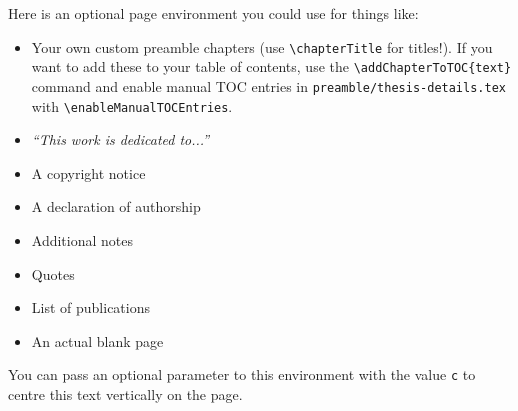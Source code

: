 
\begin{blankpage}
    
	Here is an optional page environment you could use for things like:
	\begin{itemize}
		\item Your own custom preamble chapters (use \texttt{\textbackslash chapterTitle} for titles!). If you want to add these to your table of contents, use the \texttt{\textbackslash addChapterToTOC\{text\} } command and enable manual TOC entries in \texttt{preamble/thesis-details.tex} with \texttt{\textbackslash enableManualTOCEntries}.
		\item \emph{``This work is dedicated to...''}
		\item A copyright notice
		\item A declaration of authorship
		\item Additional notes
		\item Quotes
		\item List of publications
		\item An actual blank page
	\end{itemize}
	You can pass an optional parameter to this environment with the value \texttt{c} to centre this text vertically on the page.
\end{blankpage}